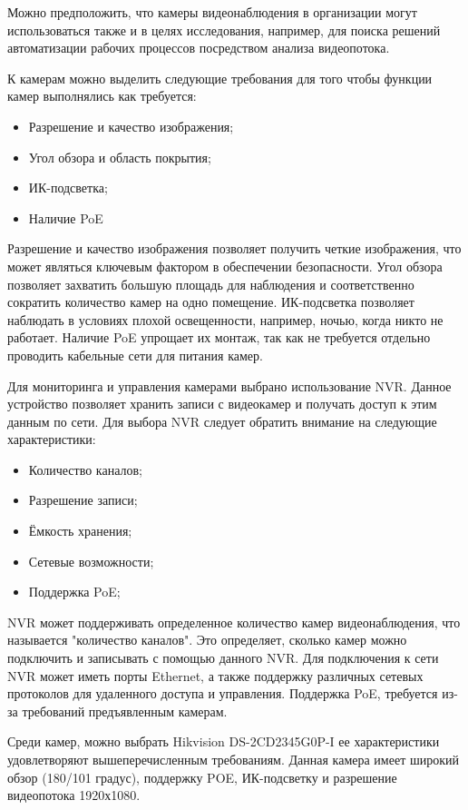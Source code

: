 Можно предположить, что камеры видеонаблюдения в организации могут использоваться также и в целях исследования, например, для 
поиска решений автоматизации рабочих процессов посредством анализа видеопотока.

К камерам можно выделить следующие требования для того чтобы функции камер выполнялись как требуется:

\begin{itemize}
    \item Разрешение и качество изображения;
    \item Угол обзора и область покрытия;
    \item ИК-подсветка;
    \item Наличие PoE
\end{itemize}

Разрешение и качество изображения позволяет получить четкие изображения, что может являться ключевым фактором в обеспечении безопасности. 
Угол обзора позволяет захватить большую площадь для наблюдения и соответственно сократить количество камер на одно помещение.
ИК-подсветка позволяет наблюдать в условиях плохой освещенности, например, ночью, когда никто не работает. Наличие PoE упрощает их
монтаж, так как не требуется отдельно проводить кабельные сети для питания камер.

Для мониторинга и управления камерами выбрано использование NVR. Данное устройство позволяет хранить записи с видеокамер и получать
доступ к этим данным по сети.
Для выбора NVR следует обратить внимание на следующие характеристики:

\begin{itemize}
    \item Количество каналов;
    \item Разрешение записи;
    \item Ёмкость хранения;
    \item Сетевые возможности;
    \item Поддержка PoE;
\end{itemize}

NVR может поддерживать определенное количество камер видеонаблюдения, 
что называется "количество каналов". Это определяет, сколько камер можно подключить и 
записывать с помощью данного NVR. Для подключения к сети NVR может иметь порты Ethernet, а также 
поддержку различных сетевых протоколов для удаленного доступа и управления. Поддержка PoE, требуется 
из-за требований предъявленным камерам. 

Среди камер, можно выбрать Hikvision DS-2CD2345G0P-I ее характеристики удовлетворяют вышеперечисленным требованиям. Данная камера имеет широкий обзор (180/101 градус),
поддержку POE, ИК-подсветку и разрешение видеопотока 1920х1080.

